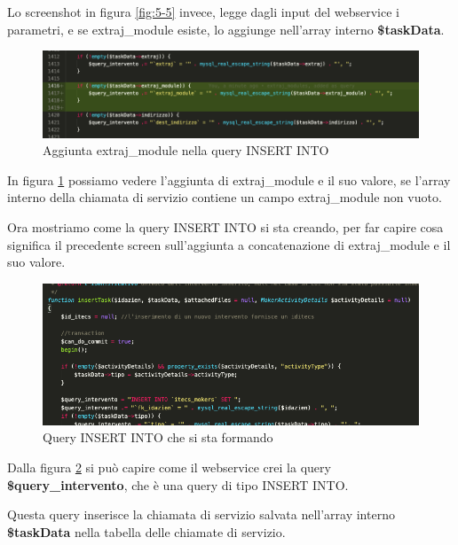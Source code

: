 	
	Lo screenshot in figura \ref{fig:5-5} invece, legge dagli input del webservice i parametri, e se extraj\_module esiste, lo aggiunge nell'array interno \textbf{\$taskData}.
	

\newspace
\begin{figure}[!h] 
	\centering
	\includegraphics[scale = 0.5]{immagini/webservices/ampliamenti/2ampl_added-extraj_modules-as-query.png}
	\caption{Aggiunta extraj\_module nella query INSERT INTO}
	\label{fig:5-6}
\end{figure}
\newspace


	In figura \ref{fig:5-6} possiamo vedere l'aggiunta di extraj\_module e il suo valore, se l'array interno della chiamata di servizio contiene un campo extraj\_module non vuoto.


\newpage


	Ora mostriamo come la query INSERT INTO si sta creando, per far capire cosa significa il precedente screen sull'aggiunta a concatenazione di extraj\_module e il suo valore.


\begin{figure}[!h] 
	\centering
	\includegraphics[scale = 0.5]{immagini/webservices/ampliamenti/2ampl_funzione_insert.png}
	\caption{Query INSERT INTO che si sta formando}
	\label{fig:5-7}
\end{figure}


	Dalla figura \ref{fig:5-7} si può capire come il webservice crei la query \textbf{\$query\_intervento}, che è una query di tipo INSERT INTO.
	
	Questa query inserisce la chiamata di servizio salvata nell'array interno \textbf{\$taskData} nella tabella delle chiamate di servizio.
	
